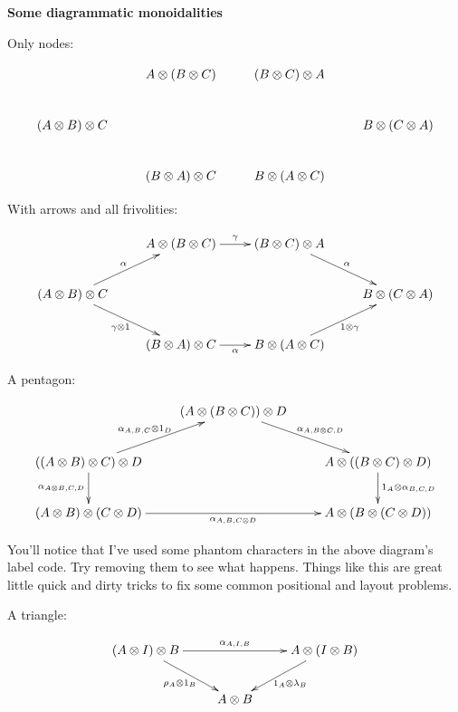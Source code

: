 \documentclass[a4paper,10pt]{article}
\numberwithin{equation}{section}
\begin{document}
\thispagestyle{empty}

\textbf{{\Large Some diagrammatic monoidalities}}
\newline
\newline

\noindent Only nodes:

$$\xymatrix{
& A \otimes (B \otimes C) & (B\otimes C) \otimes A & \\
(A\otimes B)\otimes C & & & B \otimes (C \otimes A) \\
& (B \otimes A) \otimes C & B \otimes (A \otimes C) &
}$$
\newline
\newline

\noindent With arrows and all frivolities:

$$\xymatrix{
& A \otimes (B \otimes C) \ar[r]^-{\gamma} & (B\otimes C) \otimes A \ar[rd]^-{\alpha} & \\
(A\otimes B)\otimes C \ar[ru]^-{\alpha} \ar[rd]_-{\gamma \otimes 1} & & & B \otimes (C \otimes A) \\
& (B \otimes A) \otimes C \ar[r]_-{\alpha} & B \otimes (A \otimes C) \ar[ru]_-{1 \otimes \gamma} &
}$$
\newline
\newline

\noindent A pentagon:

$$\xymatrix{
& (A \otimes (B \otimes C)) \otimes D \ar[rd]^-{\phantom{A}\alpha_{A,B\otimes C,D}}  & \\
((A \otimes B )\otimes C) \otimes D \ar[ru]^-{\alpha_{A,B,C}\otimes 1_{D}\phantom{A}} \ar[d]_-{\alpha_{A\otimes B,C,D}} & & A \otimes ((B \otimes C) \otimes D ) \ar[d]^-{1_{A}\otimes\alpha_{B,C,D}} \\
(A \otimes B) \otimes (C \otimes D) \ar[rr]_-{\alpha_{A,B,C\otimes D }} & & A \otimes (B \otimes (C \otimes D)) 
}$$
\newline

\noindent You'll notice that I've used some phantom characters in the above diagram's label code.
Try removing them to see what happens.
Things like this are great little quick and dirty tricks to fix some common positional and layout problems.

\newpage

\thispagestyle{empty}


\noindent A triangle:

$$\xymatrix{
(A\otimes I)\otimes B \ar[rr]^-{\alpha_{A,I,B}} \ar[rd]_-{\rho_{A}\otimes 1_{B}} && A\otimes (I\otimes B) \ar[ld]^-{1_{A}\otimes \lambda_{B}} \\
& A\otimes B &
}$$
\newline
\newline
\end{document}
